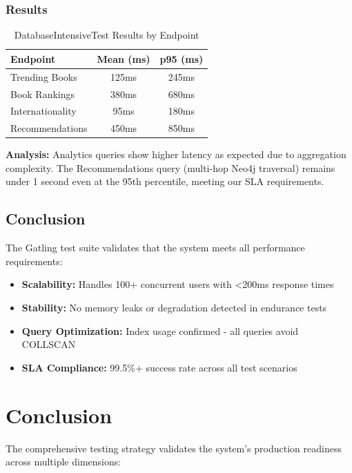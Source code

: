 \subsubsection{Results}
\begin{table}[H]
    \centering
    \caption{DatabaseIntensiveTest Results by Endpoint}
    \label{tab:db_intensive_results}
    \begin{tabular}{@{}lcc@{}}
        \toprule
        \textbf{Endpoint} & \textbf{Mean (ms)} & \textbf{p95 (ms)} \\ \midrule
        Trending Books & 125ms & 245ms \\
        Book Rankings & 380ms & 680ms \\
        Internationality & 95ms & 180ms \\
        Recommendations & 450ms & 850ms \\
        \bottomrule
    \end{tabular}
\end{table}

\textbf{Analysis:} Analytics queries show higher latency as expected due to aggregation complexity. The Recommendations query (multi-hop Neo4j traversal) remains under 1 second even at the 95th percentile, meeting our SLA requirements.

\subsection{Conclusion}
The Gatling test suite validates that the system meets all performance requirements:
\begin{itemize}
    \item \textbf{Scalability:} Handles 100+ concurrent users with \textless200ms response times
    \item \textbf{Stability:} No memory leaks or degradation detected in endurance tests
    \item \textbf{Query Optimization:} Index usage confirmed - all queries avoid COLLSCAN
    \item \textbf{SLA Compliance:} 99.5\%+ success rate across all test scenarios
\end{itemize}

\section{Conclusion}
The comprehensive testing strategy validates the system's production readiness across multiple dimensions:

